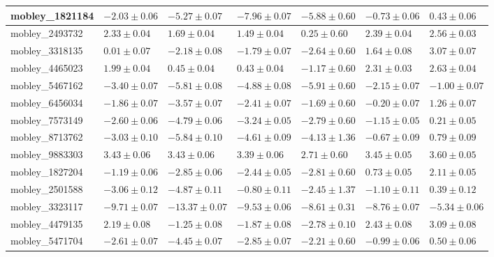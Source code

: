 \documentclass{article}
\begin{document}
\begin{landscape}
\begin{longtable}{|l{3.0cm}|l{3.0cm}|l{3.2cm}|l{3.6cm}|l{3.0cm}|l{3.0cm}|l{3.0cm}|}
mobley\_1821184	&	$	-2.03	\pm	0.06	$	&	$	-5.27	\pm	0.07	$	&	$	-7.96	\pm	0.07	$	&	$	-5.88	\pm	0.60	$	&	$	-0.73	\pm	0.06	$	&	$	0.43	\pm	0.06	$	\\ \hline
mobley\_2493732	&	$	2.33	\pm	0.04	$	&	$	1.69	\pm	0.04	$	&	$	1.49	\pm	0.04	$	&	$	0.25	\pm	0.60	$	&	$	2.39	\pm	0.04	$	&	$	2.56	\pm	0.03	$	\\ \hline
mobley\_3318135	&	$	0.01	\pm	0.07	$	&	$	-2.18	\pm	0.08	$	&	$	-1.79	\pm	0.07	$	&	$	-2.64	\pm	0.60	$	&	$	1.64	\pm	0.08	$	&	$	3.07	\pm	0.07	$	\\ \hline
mobley\_4465023	&	$	1.99	\pm	0.04	$	&	$	0.45	\pm	0.04	$	&	$	0.43	\pm	0.04	$	&	$	-1.17	\pm	0.60	$	&	$	2.31	\pm	0.03	$	&	$	2.63	\pm	0.04	$	\\ \hline
mobley\_5467162	&	$	-3.40	\pm	0.07	$	&	$	-5.81	\pm	0.08	$	&	$	-4.88	\pm	0.08	$	&	$	-5.91	\pm	0.60	$	&	$	-2.15	\pm	0.07	$	&	$	-1.00	\pm	0.07	$	\\ \hline
mobley\_6456034	&	$	-1.86	\pm	0.07	$	&	$	-3.57	\pm	0.07	$	&	$	-2.41	\pm	0.07	$	&	$	-1.69	\pm	0.60	$	&	$	-0.20	\pm	0.07	$	&	$	1.26	\pm	0.07	$	\\ \hline
mobley\_7573149	&	$	-2.60	\pm	0.06	$	&	$	-4.79	\pm	0.06	$	&	$	-3.24	\pm	0.05	$	&	$	-2.79	\pm	0.60	$	&	$	-1.15	\pm	0.05	$	&	$	0.21	\pm	0.05	$	\\ \hline
mobley\_8713762	&	$	-3.03	\pm	0.10	$	&	$	-5.84	\pm	0.10	$	&	$	-4.61	\pm	0.09	$	&	$	-4.13	\pm	1.36	$	&	$	-0.67	\pm	0.09	$	&	$	0.79	\pm	0.09	$	\\ \hline
mobley\_9883303	&	$	3.43	\pm	0.06	$	&	$	3.43	\pm	0.06	$	&	$	3.39	\pm	0.06	$	&	$	2.71	\pm	0.60	$	&	$	3.45	\pm	0.05	$	&	$	3.60	\pm	0.05	$	\\ \hline
mobley\_1827204	&	$	-1.19	\pm	0.06	$	&	$	-2.85	\pm	0.06	$	&	$	-2.44	\pm	0.05	$	&	$	-2.81	\pm	0.60	$	&	$	0.73	\pm	0.05	$	&	$	2.11	\pm	0.05	$	\\ \hline
mobley\_2501588	&	$	-3.06	\pm	0.12	$	&	$	-4.87	\pm	0.11	$	&	$	-0.80	\pm	0.11	$	&	$	-2.45	\pm	1.37	$	&	$	-1.10	\pm	0.11	$	&	$	0.39	\pm	0.12	$	\\ \hline
mobley\_3323117	&	$	-9.71	\pm	0.07	$	&	$	-13.37	\pm	0.07	$	&	$	-9.53	\pm	0.06	$	&	$	-8.61	\pm	0.31	$	&	$	-8.76	\pm	0.07	$	&	$	-5.34	\pm	0.06	$	\\ \hline
mobley\_4479135	&	$	2.19	\pm	0.08	$	&	$	-1.25	\pm	0.08	$	&	$	-1.87	\pm	0.08	$	&	$	-2.78	\pm	0.10	$	&	$	2.43	\pm	0.08	$	&	$	3.09	\pm	0.08	$	\\ \hline
mobley\_5471704	&	$	-2.61	\pm	0.07	$	&	$	-4.45	\pm	0.07	$	&	$	-2.85	\pm	0.07	$	&	$	-2.21	\pm	0.60	$	&	$	-0.99	\pm	0.06	$	&	$	0.50	\pm	0.06	$	\\ \hline

\end{longtable}
\end{landscape}
\end{document}
